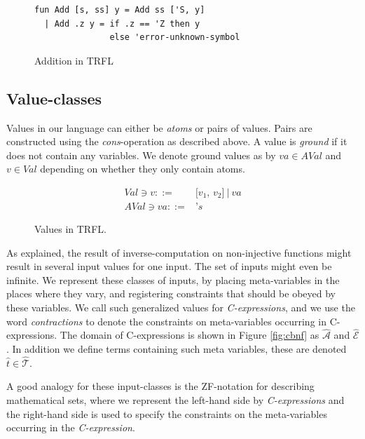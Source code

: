\documentclass[10pt]{../sigplanconf}
\begin{document}
\begin{figure}
  \centering
\begin{verbatim}
fun Add [s, ss] y = Add ss ['S, y]
  | Add .z y = if .z == 'Z then y
               else 'error-unknown-symbol
\end{verbatim}
  \caption{Addition in TRFL}
  \label{fig:addprog}
\end{figure}


\subsection{Value-classes}
Values in our language can either be \textit{atoms} or pairs of
values. Pairs are constructed using the \textit{cons}-operation as
described above. A value is \textit{ground} if it does not contain any
variables. We denote ground values as by $va \in AVal$ and $v \in Val$
depending on whether they only contain atoms.

\begin{figure}\centering
  \begin{align*}
    Val \ni v ::= & \texttt{[$v_1$, $v_2$]}\ |\ va\\
    AVal \ni va ::= & \texttt{'}s
  \end{align*}
  \caption{Values in TRFL.}
\label{fig:vbnf}
\end{figure}

As explained, the result of inverse-computation on non-injective
functions might result in several input values for one input. The set
of inputs might even be infinite. We represent these classes of
inputs, by placing meta-variables in the places where they vary, and
registering constraints that should be obeyed by these variables.  We
call such generalized values for \textit{C-expressions}, and we use
the word \textit{contractions} to denote the constraints on
meta-variables occurring in C-expressions. The domain of
C-expressions is shown in Figure \ref{fig:cbnf} as
$\mathcal{\widehat{A}}$ and $\mathcal{\widehat{E}}$. In addition we
define terms containing such meta variables, these are denoted
$\widehat{t} \in \widehat{\mathcal{T}}$.

A good analogy for these input-classes is the ZF-notation for
describing mathematical sets, where we represent the left-hand side by
\textit{C-expressions} and the right-hand side is used to specify the
constraints on the meta-variables occurring in the
\textit{C-expression}. 
\end{document}
